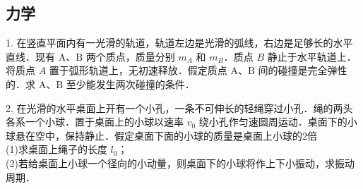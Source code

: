 
\subsection{力学}
1. 在竖直平面内有一光滑的轨道，轨道左边是光滑的弧线，右边是足够长的水平直线．现有 $\mathrm{A}$、$\mathrm{B}$ 两个质点，质量分别 $m_{A}$ 和 $m_B$．质点 $B$ 静止于水平轨道上．将质点 $A$ 置于弧形轨道上，无初速释放．假定质点 $\mathrm{A}$、$\mathrm{B}$ 间的碰撞是完全弹性的．求 $\mathrm{A}$、$\mathrm{B}$ 至少能发生两次碰撞的条件．

2. 在光滑的水平桌面上开有一个小孔，一条不可伸长的轻绳穿过小孔．绳的两头各系一个小球．置于桌面上的小球以速率 $v_{0}$ 绕小孔作匀速圆周运动．桌面下的小球悬在空中，保持静止．假定桌面下面的小球的质量是桌面上小球的2倍\\
(1)求桌面上绳子的长度 $l_{0}$；\\
(2)若给桌面上小球一个径向的小动量，则桌面下的小球将作上下小振动，求振动周期．